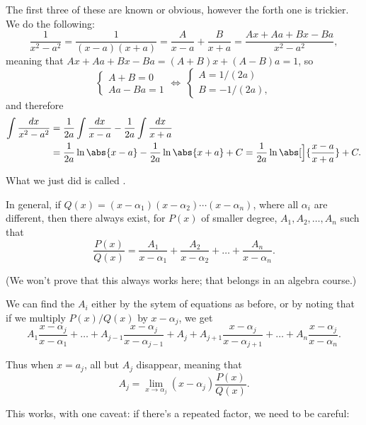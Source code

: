 \noindent
The first three of these are known or obvious, however the forth one is trickier.
We do the following:
\[
	\frac{1}{x^2 - a^2} = \frac{1}{(x - a)(x + a)} = \frac{A}{x - a} + \frac{B}{x + a} = \frac{A x + A a + B x - B a}{x^2 - a^2},
\]
meaning that $A x + A a + B x - B a = (A + B) x + (A - B) a = 1$, so
\[
	\begin{cases}
		A + B = 0 \\
		A a - B a = 1
	\end{cases} \Longleftrightarrow~
	\begin{cases}
		A = 1 / (2 a) \\
		B = - 1 / (2 a),
	\end{cases}
\]
and therefore
\begin{align*}
	\int \frac{d x}{x^2 - a^2} &= \frac{1}{2 a} \int \frac{d x}{x - a} - \frac{1}{2 a} \int \frac{d x}{x + a} \\
	                           &= \frac{1}{2 a} \ln\abs{x - a} - \frac{1}{2 a} \ln\abs{x + a} + C = \frac{1}{2 a} \ln\abs[\Big]{\frac{x - a}{x + a}} + C.
\end{align*}

\noindent
What we just did is called .

In general, if $Q(x) = (x - \alpha_1)(x - \alpha_2) \cdots (x - \alpha_n)$, where all $\alpha_i$ are different, then there always exist, for $P(x)$ of smaller degree, $A_1, A_2, \ldots, A_n$ such that
\[
	\frac{P(x)}{Q(x)} = \frac{A_1}{x - \alpha_1} + \frac{A_2}{x - \alpha_2} + \ldots + \frac{A_n}{x - \alpha_n}.
\]

\noindent
(We won't prove that this always works here; that belongs in an algebra course.)

We can find the $A_i$ either by the sytem of equations as before, or by noting that if we multiply $P(x) / Q(x)$ by $x - \alpha_j$, we get
\[
	A_1 \frac{x - \alpha_j}{x - \alpha_1} + \ldots + A_{j - 1} \frac{x - \alpha_j}{x - \alpha_{j - 1}} + A_j + A_{j + 1} \frac{x - \alpha_j}{x - \alpha_{j + 1}} + \ldots + A_n \frac{x - \alpha_j}{x - \alpha_n}.
\]

\noindent
Thus when $x = a_j$, all but $A_j$ disappear, meaning that
\[
	A_j = \lim_{x \to \alpha_j} (x - \alpha_j) \frac{P(x)}{Q(x)}.
\]

\noindent
This works, with one caveat: if there's a repeated factor, we need to be careful:

